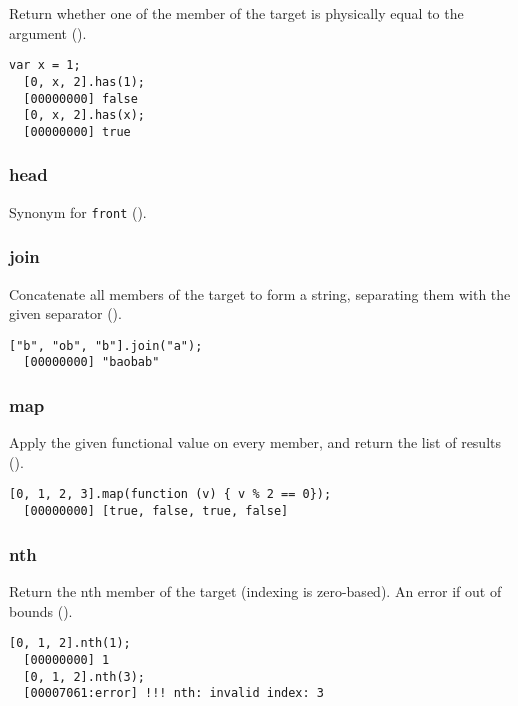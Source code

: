 Return whether one of the member of the target is physically equal to
the argument ().

\begin{lstlisting}[caption=List.hasSame, label=lst:list-hasSame, float=\floatposh]
  var x = 1;
  [0, x, 2].has(1);
  [00000000] false
  [0, x, 2].has(x);
  [00000000] true
\end{lstlisting}

\subsubsection{head}

Synonym for \lstinline|front| ().

\subsubsection{join}

Concatenate all members of the target to form a string, separating
them with the given separator ().

\begin{lstlisting}[caption=List.join, label=lst:list-join, float=\floatposh]
  ["b", "ob", "b"].join("a");
  [00000000] "baobab"
\end{lstlisting}

\subsubsection{map}

Apply the given functional value on every member, and return the list
of results ().

\begin{lstlisting}[caption=List.map, label=lst:list-map, float=\floatposh]
  [0, 1, 2, 3].map(function (v) { v % 2 == 0});
  [00000000] [true, false, true, false]
\end{lstlisting}

\subsubsection{nth}
\label{sect:std-list-nth}

Return the nth member of the target (indexing is zero-based). An error
if out of bounds ().

\begin{lstlisting}[caption=List.nth, label=lst:list-nth, float=\floatposh]
  [0, 1, 2].nth(1);
  [00000000] 1
  [0, 1, 2].nth(3);
  [00007061:error] !!! nth: invalid index: 3
\end{lstlisting}

